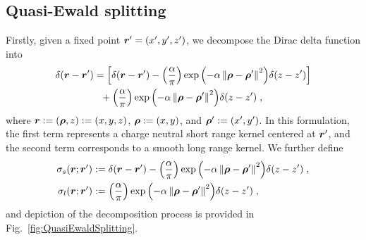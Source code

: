 \subsection{Quasi-Ewald splitting}
Firstly, given a fixed point  $\boldsymbol{r}^\prime=(x^{\prime}, y^{\prime},z^{\prime})$, we decompose   the Dirac delta function into
\begin{equation}\label{eq...text...Quasi-EwaldMethod...QuasiEwaldSplitting}
\begin{aligned}
    \delta(\boldsymbol{r}-\boldsymbol{r}^\prime) &= \left[\delta (\boldsymbol{r}-\boldsymbol{r}^\prime) - {\left( \frac{\alpha}{\pi} \right)} \exp{\left(-\alpha \left\lVert\bm{\rho}-\bm{\rho}^\prime\right\rVert^2\right)} \delta(z-z^\prime) \right]\\&~~ + {\left( \frac{\alpha}{\pi} \right)} \exp{\left(-\alpha \left\lVert\bm{\rho}-\bm{\rho}^\prime\right\rVert^2\right)} \delta(z-z^\prime)\;,
    \end{aligned}
\end{equation}
where $\bm{r}:=(\bm{\rho}, z):=(x,y,z)$,   $\bm{\rho}:=(x,y)$, and $\bm{\rho}^\prime:=(x^\prime,y^\prime)$.
 In this formulation, the first term represents  a charge neutral short range kernel centered at $\bm{r}^\prime$, and the second term corresponds to a smooth long range kernel.  We further define  
\begin{equation}\label{eq...text...Kernels}
    \begin{split}
        \sigma_{s}(\boldsymbol{r}; \bm{r}^\prime) &:= \delta (\boldsymbol{r}-\boldsymbol{r}^\prime) - {\left( \frac{\alpha}{\pi} \right)} \exp{\left(-\alpha \left\lVert\bm{\rho}-\bm{\rho}^\prime\right\rVert^2\right)} \delta(z-z^\prime)\;,\\
        \sigma_{l}(\boldsymbol{r};\bm{r}^\prime) &:= {\left( \frac{\alpha}{\pi} \right)} \exp{\left(-\alpha \left\lVert\bm{\rho}-\bm{\rho}^\prime\right\rVert^2\right)} \delta(z-z^\prime)\;,
    \end{split}
\end{equation}
%
%
and  depiction of the decomposition process is provided in Fig.~\ref{fig:QuasiEwaldSplitting}.  
